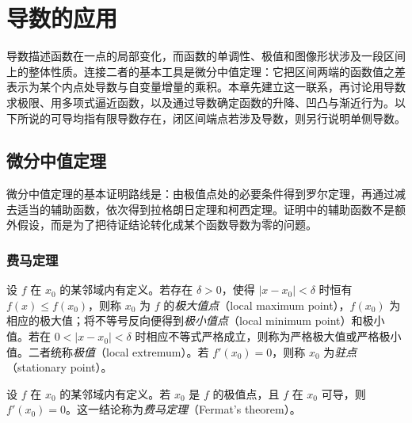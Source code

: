 \setcounter{chapter}{4} %
\chapter{导数的应用}
\label{chap:applications-of-derivatives}

导数描述函数在一点的局部变化，而函数的单调性、极值和图像形状涉及一段区间上的整体性质。连接二者的基本工具是微分中值定理：它把区间两端的函数值之差表示为某个内点处导数与自变量增量的乘积。本章先建立这一联系，再讨论用导数求极限、用多项式逼近函数，以及通过导数确定函数的升降、凹凸与渐近行为。以下所说的可导均指有限导数存在，闭区间端点若涉及导数，则另行说明单侧导数。

\section{微分中值定理}
\label{sec:differential-mean-value-theorems}

微分中值定理的基本证明路线是：由极值点处的必要条件得到罗尔定理，再通过减去适当的辅助函数，依次得到拉格朗日定理和柯西定理。证明中的辅助函数不是额外假设，而是为了把待证结论转化成某个函数导数为零的问题。

\subsection{费马定理}
\label{subsec:fermat-theorem}

\begin{definition}
\label{def:local-extrema-and-stationary-points}
设 $f$ 在 $x_0$ 的某邻域内有定义。若存在 $\delta>0$，使得 $|x-x_0|<\delta$ 时恒有 $f(x)\leq f(x_0)$，则称 $x_0$ 为 $f$ 的\emph{极大值点}（local maximum point），$f(x_0)$ 为相应的极大值；将不等号反向便得到\emph{极小值点}（local minimum point）和极小值。若在 $0<|x-x_0|<\delta$ 时相应不等式严格成立，则称为严格极大值或严格极小值。二者统称\emph{极值}（local extremum）。若 $f'(x_0)=0$，则称 $x_0$ 为\emph{驻点}（stationary point）。
\end{definition}

\begin{theorem}[费马定理]
\label{thm:fermat-stationary-point}
设 $f$ 在 $x_0$ 的某邻域内有定义。若 $x_0$ 是 $f$ 的极值点，且 $f$ 在 $x_0$ 可导，则 $f'(x_0)=0$。这一结论称为\emph{费马定理}（Fermat's theorem）。
\end{theorem}

